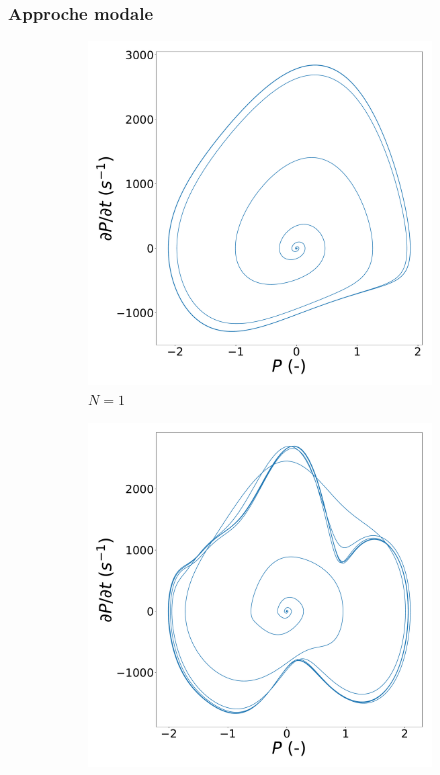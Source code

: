 \subsubsection{Approche modale}
\begin{figure}
    \centering
    \begin{subfigure}[b]{.24\linewidth}
        \includegraphics[width=\linewidth]{img/phase_diagram_N1.pdf}
        \caption{$N=1$}
        \label{fig:VDP_phase_N1}
    \end{subfigure}
    \hfill
    \begin{subfigure}[b]{.24\linewidth}
        \includegraphics[width=\linewidth]{img/phase_diagram_N2.pdf}

\end{subfigure}
\end{figure}
